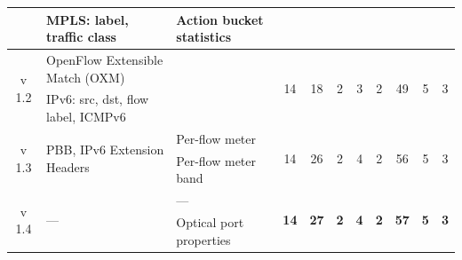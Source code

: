 {\begin{table}[ht!]
\begin{center}
\begin{tabular}{|c|l|l|c|c|c|c|c|c|c|c|}
                         & MPLS: label, traffic class              & Action bucket statistics    &                     &                     &                    &                    &                    &                     &                    &                    \\ \hline
\multirow{2}{*}{v 1.2} & OpenFlow Extensible Match (OXM)         &                             & \multirow{2}{*}{14} & \multirow{2}{*}{18} & \multirow{2}{*}{2} & \multirow{2}{*}{3} & \multirow{2}{*}{2} & \multirow{2}{*}{49} & \multirow{2}{*}{5} & \multirow{2}{*}{3} \\ \cline{2-3}
                         & IPv6: src, dst, flow label, ICMPv6      &                             &                     &                     &                    &                    &                    &                     &                    &                    \\ \hline
\multirow{2}{*}{v 1.3} & \multirow{2}{*}{PBB, IPv6 Extension Headers} & Per-flow meter              & \multirow{2}{*}{14} & \multirow{2}{*}{26} & \multirow{2}{*}{2} & \multirow{2}{*}{4} & \multirow{2}{*}{2} & \multirow{2}{*}{56} & \multirow{2}{*}{5} & \multirow{2}{*}{3} \\ \cline{3-3}
                         &                                         & Per-flow meter band         &                     &                     &                    &                    &                    &                     &                    &                    \\ \hline
\multirow{2}{*}{v 1.4} & \multirow{2}{*}{---} & ---            & \multirow{2}{*}{\textbf{14}} & \multirow{2}{*}{\textbf{27}} & \multirow{2}{*}{\textbf{2}} & \multirow{2}{*}{\textbf{4}} & \multirow{2}{*}{\textbf{2}} & \multirow{2}{*}{\textbf{57}} & \multirow{2}{*}{\textbf{5}} & \multirow{2}{*}{\textbf{3}} \\ \cline{3-3}
                         &                                         & Optical port properties        &                     &                     &                    &                    &                    &                     &                    &                    \\ \hline
\end{tabular}
\end{center}
\end{table}
}

